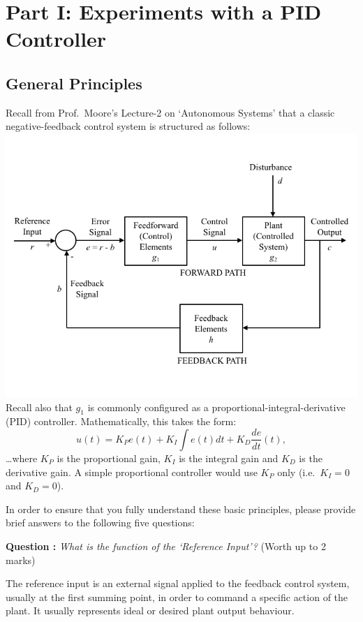 \documentclass[hidelinks,a4paper,11pt]{article}
\newcounter{question}
\newcommand\myq{\refstepcounter{question}\thequestion}
\begin{document}
\section{Part I: Experiments with a PID Controller}

\subsection{General Principles}

Recall from Prof.\ Moore's Lecture-2 on `Autonomous Systems' that a classic negative-feedback
control system is structured as follows:\\
\includegraphics[width=\textwidth]{ClassicControlSystem.png}
Recall also that $g_1$ is commonly configured as a proportional-integral-derivative (PID)
controller.  Mathematically, this takes the form:
$$u(t) = K_P e(t) + K_I \int e(t)dt + K_D \frac{de}{dt}(t) ,$$ \ldots where $K{_P}$ is the
proportional gain, $K_I$ is the integral gain and $K_D$ is the derivative gain.  A simple
proportional controller would use $K_P$ only (i.e.\ $K_I=0$ and $K_D=0$).

In order to ensure that you fully understand these basic principles, please provide brief answers to
the following five questions:

{\bfseries Question \myq:}  \emph{What is the function of the `Reference Input'?} (Worth up to 2
marks)\\
\begin{mdframed}
The reference input is an external signal applied to the feedback control system, usually at the
first summing point, in order to command a specific action of the plant. It usually represents ideal
or desired plant output behaviour.

\end{mdframed}
\vspace*{\baselineskip}
\end{document}
